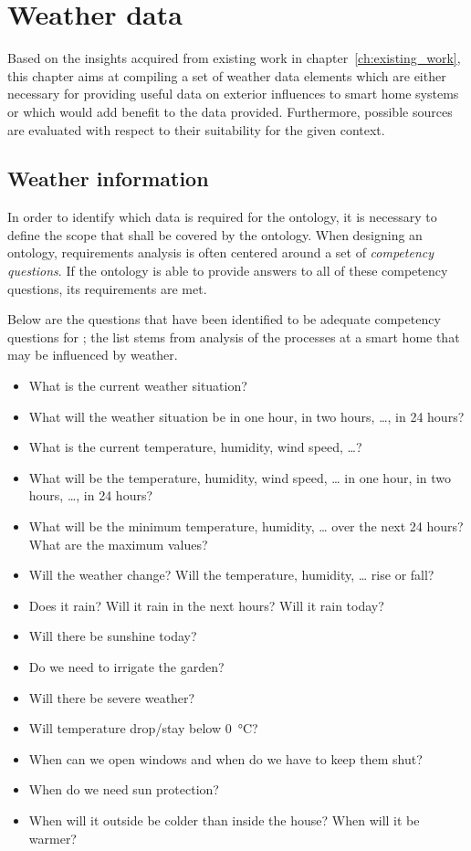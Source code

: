 \chapter{Weather data}
\label{ch:weather_data}

Based on the insights acquired from existing work in chapter~\ref{ch:existing_work}, this chapter aims at compiling a set of weather data elements which are either necessary for providing useful data on exterior influences to smart home systems or which would add benefit to the data provided. Furthermore, possible sources are evaluated with respect to their suitability for the given context.

\section{Weather information}
\label{sec:weather_information}

In order to identify which data is required for the \smarthomeweather ontology, it is necessary to define the scope that shall be covered by the ontology. When designing an ontology, requirements analysis is often centered around a set of \emph{competency questions}\cite{Ontology101,UscholdKing,GruningerFox,Methontology}. If the ontology is able to provide answers to all of these competency questions, its requirements are met.

Below are the questions that have been identified to be adequate competency questions for \smarthomeweather; the list stems from analysis of the processes at a smart home that may be influenced by weather.

\begin{itemize}
  \item What is the current weather situation?
  \item What will the weather situation be in one hour, in two hours, …, in 24 hours?
  \item What is the current temperature, humidity, wind speed, …?
  \item What will be the temperature, humidity, wind speed, … in one hour, in two hours, …, in 24 hours?
  \item What will be the minimum temperature, humidity, … over the next 24 hours? What are the maximum values?
  \item Will the weather change? Will the temperature, humidity, … rise or fall?
  \item Does it rain? Will it rain in the next hours? Will it rain today?
  \item Will there be sunshine today? 
  \item Do we need to irrigate the garden?
  \item Will there be severe weather?
  \item Will temperature drop/stay below \SI{0}{\celsius}?
  \item When can we open windows and when do we have to keep them shut?
  \item When do we need sun protection?
  \item When will it outside be colder than inside the house? When will it be warmer?
\end{itemize}

